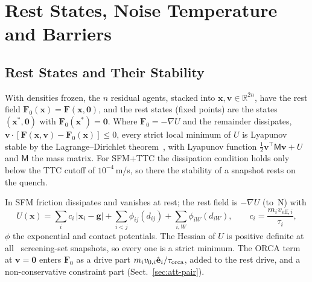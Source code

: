\section{Rest States, Noise Temperature and Barriers}\label{sec:methods}
\subsection{Rest States and Their Stability}\label{sec:rest}
With densities frozen, the $n$ residual agents, stacked into $\mathbf{x},\mathbf{v}\in\mathbb R^{2n}$, have the rest field $\mathbf{F}_0(\mathbf{x})=\mathbf{F}(\mathbf{x},\mathbf{0})$, and the rest states (fixed points) are the states $(\mathbf{x}^\ast,\mathbf{0})$ with $\mathbf{F}_0(\mathbf{x}^\ast)=\mathbf{0}$. Where $\mathbf{F}_0=-\nabla U$ and the remainder dissipates, $\mathbf{v}\cdot[\mathbf{F}(\mathbf{x},\mathbf{v})-\mathbf{F}_0(\mathbf{x})]\le0$, every strict local minimum of $U$ is Lyapunov stable by the Lagrange--Dirichlet theorem~\cite{merkin1996}, with Lyapunov function $\tfrac12\mathbf{v}^{\top}\mathsf{M}\mathbf{v}+U$ and $\mathsf{M}$ the mass matrix. For SFM+TTC the dissipation condition holds only below the TTC cutoff of $10^{-4}$\,m/s, so there the stability of a snapshot rests on the quench.

In SFM friction dissipates and vanishes at rest; the rest field is $-\nabla U$ (to \ResidAllMax\,N) with
\begin{equation}\label{eq:U}
U(\mathbf{x})=\sum_i c_i\,|\mathbf{x}_i-\mathbf{g}|+\sum_{i<j}\phi_{ij}(d_{ij})+\sum_{i,W}\phi_{iW}(d_{iW}),\qquad c_i=\frac{m_iv_{\mathrm{eff},i}}{\tau_i},
\end{equation}
$\phi$ the exponential and contact potentials. The Hessian of $U$ is positive definite at all \RevAtenStrict\ screening-set snapshots, so every one is a strict minimum. The ORCA term at $\mathbf{v}=\mathbf{0}$ enters $\mathbf{F}_0$ as a drive part $m_iv_{0,i}\hat{\mathbf e}_i/\tau_{\rm orca}$, added to the rest drive, and a non-conservative constraint part (Sect.~\ref{sec:att-pair}).

